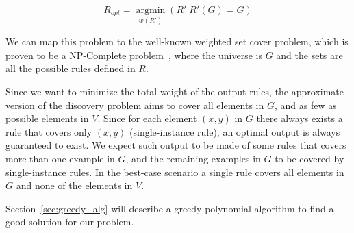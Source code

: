 $$R_{opt}=\underset{w(R')}{\operatorname{argmin}}(R'|R'(G) = G)$$


We can map this problem to the well-known weighted set cover problem, which is proven to be a NP-Complete problem~\cite{chvatal1979greedy}, where the universe is $G$ and the sets are all the possible rules defined in $R$.

Since we want to minimize the total weight of the output rules, the approximate version of the discovery problem aims to cover all elements in $G$, and as few as possible elements in $V$. Since for each element $(x,y)$ in $G$ there always exists a rule that covers only $(x,y)$ (single-instance rule), an optimal output is always guaranteed to exist. We expect such output to be made of some rules that covers more than one example in $G$, and the remaining examples in $G$ to be covered by single-instance rules. In the best-case scenario a single rule covers all elements in $G$ and none of the elements in $V$.

Section~\ref{sec:greedy_alg} will describe a greedy polynomial algorithm to find a good solution for our problem. 




